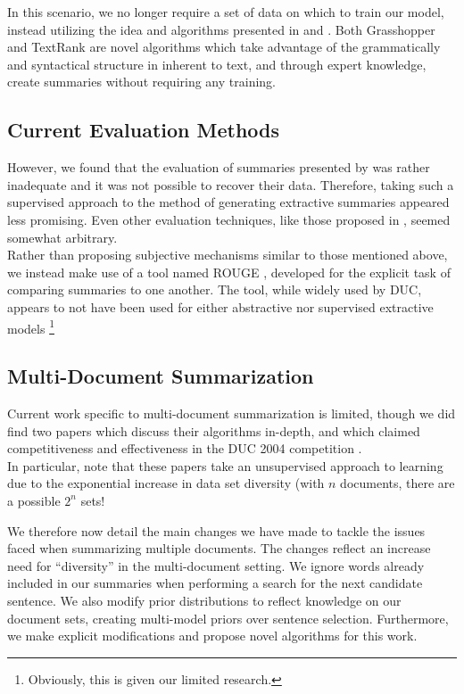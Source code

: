 \documentclass[10pt]{article}
\begin{document}
In this scenario, we no longer require a set of data on which to train our model, instead utilizing the idea and algorithms presented in \cite{grasshopper} and \cite{textrank}. Both {\sc Grasshopper} and {\sc TextRank} are novel algorithms which take advantage of the grammatically and syntactical structure in inherent to text, and through expert knowledge, create summaries without requiring any training.

\subsection{Current Evaluation Methods}
However, we found that the evaluation of summaries presented by \cite{hmm_summary} was rather inadequate and it was not possible to recover their data. Therefore, taking such a supervised approach to the method of generating extractive summaries appeared less promising. Even other evaluation techniques, like those proposed in \cite{survey}, seemed somewhat arbitrary. \\

Rather than proposing subjective mechanisms similar to those mentioned above, we instead make use of a tool named ROUGE \cite{rouge}, developed for the explicit task of comparing summaries to one another. The tool, while widely used by DUC, appears to not have been used for either abstractive nor supervised extractive models \footnote{Obviously, this is given our limited research.}

\subsection{Multi-Document Summarization}
Current work specific to multi-document summarization is limited, though we did find two papers which discuss their algorithms in-depth, and which claimed competitiveness and effectiveness in the DUC 2004 competition \cite{grasshopper} \cite{textrank}.\\

In particular, note that these papers take an unsupervised approach to learning due to the exponential increase in data set diversity (with $n$ documents, there are a possible $2^n$ sets!

We therefore now detail the main changes we have made to tackle the issues faced when summarizing multiple documents. The changes reflect an increase need for “diversity” in the multi-document setting. We ignore words already included in our summaries when performing a search for the next candidate sentence. We also modify prior distributions to reflect knowledge on our document sets, creating multi-model priors over sentence selection. Furthermore, we make explicit modifications and propose novel algorithms for this work.
\end{document}
